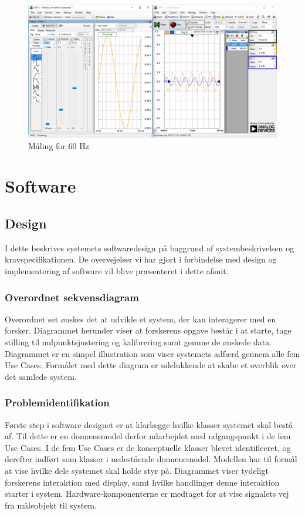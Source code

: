 \begin{figure}[htb]
	\centering
	\includegraphics[width=1.0\textwidth]{Figurer/60Hz}
	\caption{Måling for 60 Hz}
	\label{fig:maeling60Hz}
\end{figure}



\section{Software}
\subsection{Design}
I dette beskrives systemets softwaredesign på baggrund af systembeskrivelsen og kravspecifikationen. De overvejelser vi har gjort i forbindelse med design og implementering af software vil blive præsenteret i dette afsnit. 

\subsubsection{Overordnet sekvensdiagram}
Overordnet set ønskes det at udvikle et system, der kan interagerer med en forsker. Diagrammet herunder viser at forskerens opgave består i at starte, tage stilling til nulpunktsjustering og kalibrering samt gemme de ønskede data. Diagrammet er en simpel illustration som viser systemets adfærd gennem alle fem Use Cases. Formålet med dette diagram er udelukkende at skabe et overblik over det samlede system.

\subsubsection{Problemidentifikation}
Første step i software designet er at klarlægge hvilke klasser systemet skal bestå af. Til dette er en domænemodel derfor udarbejdet med udgangspunkt i de fem Use Cases. I de fem Use Cases er de konceptuelle klasser blevet identificeret, og derefter indført som klasser i nedestående domænemodel. Modellen har til formål at vise hvilke dele systemet skal holde styr på. 
Diagrammet viser tydeligt forskerens interaktion med display, samt hvilke handlinger denne interaktion starter i system. Hardware-komponenterne er medtaget for at vise signalets vej fra måleobjekt til system. 

